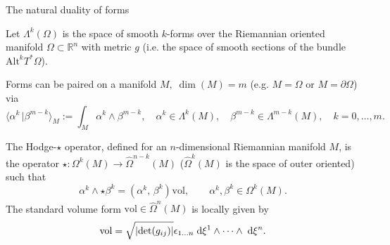 \documentclass[aspectratio=169]{beamer}
\newcommand{\bbR}{\mathbb{R}}
\newcommand{\inpr}[3][]{\ensuremath{( #2, \, #3 )_{#1}}}
\newcommand{\dualpr}[3][]{\ensuremath{\langle #2 \, \vert #3 \rangle_{#1}}}
\newcommand*{\dual}[1]{\ensuremath{\widehat{#1}}}
\begin{document}
	
\begin{frame}{The natural duality of forms}
	
	Let $\Lambda^k(\Omega)$ is the space of smooth $k$-forms over the Riemannian oriented manifold $\Omega \subset \bbR^n$ with metric $g$ (i.e. the space of smooth sections of the bundle $\mathrm{Alt}^k T^* \Omega$).
	

	\begin{definition}
		Forms can be paired on a manifold $M, \; \dim(M)=m$ (e.g. $M=\Omega$ or $M=\partial \Omega$) via
		\begin{equation*}
			\dualpr[M]{\alpha^k}{\beta^{m-k}} := \int_M \alpha^k \wedge \beta^{m-k}, \quad \alpha^{k} \in \Lambda^{k}(M), \quad \beta^{m-k} \in \Lambda^{m-k}(M), \quad k=0, \dots, m.
		\end{equation*}
		
	\end{definition}



\begin{definition}
	The Hodge-$\star$ operator, defined for an $n$-dimensional Riemannian manifold $M$, is the operator $\star : \Omega^k(M) \rightarrow \dual{\Omega}^{n-k}(M)$ ($\dual{\Omega}^k(M)$ is the space of outer oriented) such that
	\begin{equation*}
		\alpha^k \wedge {\star \beta^k} = \inpr{\alpha^k}{\beta^k} \mathrm{vol}, \qquad \alpha^k, \beta^k \in \Omega^k(M).
	\end{equation*}
	The standard volume form $\mathrm{vol}\in \dual{\Omega}^{n}(M)$ is locally given by
	\begin{equation*}
		\mathrm{vol} = \sqrt{|\mathrm{det}(g_{ij})|} \epsilon_{1\dots n}\d\xi^1 \wedge \dots \wedge \d\xi^n.
	\end{equation*}
	
\end{definition}
	
	
\end{frame}
	
\end{document}
